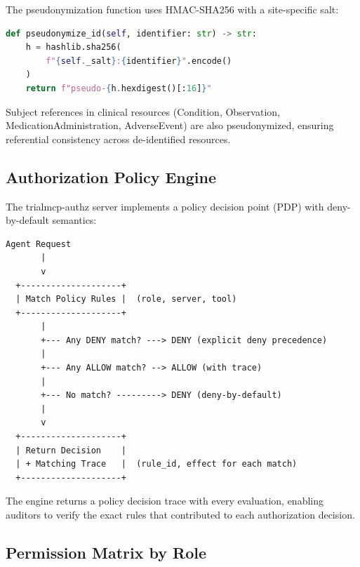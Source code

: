 \documentclass[10pt,letterpaper]{article}
\begin{document}
The pseudonymization function uses HMAC-SHA256 with a site-specific salt:

\begin{lstlisting}[language=Python,title={\textbf{HMAC-SHA256 Pseudonymization (v0.2.0)}}]
def pseudonymize_id(self, identifier: str) -> str:
    h = hashlib.sha256(
        f"{self._salt}:{identifier}".encode()
    )
    return f"pseudo-{h.hexdigest()[:16]}"
\end{lstlisting}

Subject references in clinical resources (Condition, Observation, MedicationAdministration, AdverseEvent) are also pseudonymized, ensuring referential consistency across de-identified resources.

\subsection{Authorization Policy Engine}

The trialmcp-authz server implements a policy decision point (PDP) with deny-by-default semantics:

\begin{lstlisting}[title={\textbf{Authorization Decision Flow}}]
  Agent Request
       |
       v
  +--------------------+
  | Match Policy Rules |  (role, server, tool)
  +--------------------+
       |
       +--- Any DENY match? ---> DENY (explicit deny precedence)
       |
       +--- Any ALLOW match? --> ALLOW (with trace)
       |
       +--- No match? ---------> DENY (deny-by-default)
       |
       v
  +--------------------+
  | Return Decision    |
  | + Matching Trace   |  (rule_id, effect for each match)
  +--------------------+
\end{lstlisting}

The engine returns a policy decision trace with every evaluation, enabling auditors to verify the exact rules that contributed to each authorization decision.

\subsection{Permission Matrix by Role}
\end{document}
